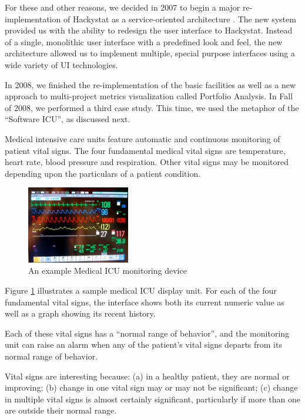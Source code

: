 \documentclass[times,10pt,twocolumn]{article}
\begin{document}
For these and other reasons, we decided in 2007 to begin a major
re-implementation of Hackystat as a service-oriented architecture
\cite{csdl2-09-07}. The new system provided us with the ability to redesign
the user interface to Hackystat.  Instead of a single, monolithic user
interface with a predefined look and feel, the new architecture allowed us
to implement multiple, special purpose interfaces using a wide variety of
UI technologies.  

In 2008, we finished the re-implementation of the basic facilities as well
as a new approach to multi-project metrics visualization called Portfolio
Analysis.  In Fall of 2008, we performed a third case study. This time, we
used the metaphor of the ``Software ICU'', as discussed next.

\label{sec:icu}

Medical intensive care units feature automatic and continuous monitoring of
patient vital signs.  The four fundamental medical vital signs are
temperature, heart rate, blood pressure and respiration.  Other vital signs
may be monitored depending upon the particulars of a patient condition.

\begin{figure}[ht]
  \center
  \includegraphics[width=0.4\textwidth]{micu-screen.eps}
  \caption{An example Medical ICU monitoring device}
  \label{fig:micu}
\end{figure} 

Figure \ref{fig:micu} illustrates a sample medical ICU display unit. For
each of the four fundamental vital signs, the interface shows both its
current numeric value as well as a graph showing its recent history.  

Each of these vital signs has a ``normal range of behavior'', and the
monitoring unit can raise an alarm when any of the patient's vital signs departs
from its normal range of behavior.

Vital signs are interesting because: (a) in a healthy patient, they are
normal or improving; (b) change in one vital sign may or may not be
significant; (c) change in multiple vital signs is almost certainly
significant, particularly if more than one are outside their normal range.
\end{document}
